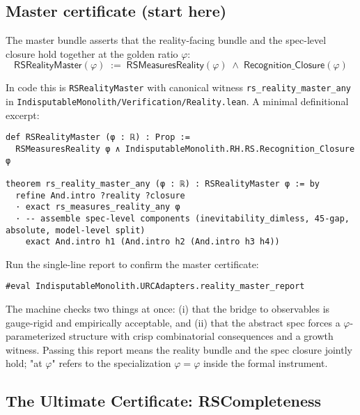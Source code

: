 \documentclass[11pt,a4paper,twoside]{article}
\numberwithin{equation}{section}
\newcommand{\phigr}{\varphi} %
\theoremstyle{customthm}
\theoremstyle{customdef}
\theoremstyle{customrem}
\begin{document}
\subsection{Master certificate (start here)}

\begin{importantbox}
The master bundle asserts that the reality-facing bundle and the spec-level closure hold together at the golden ratio $\varphi$:
\begin{equation}
\boxed{\mathsf{RSRealityMaster}(\varphi) \;:=\; \mathsf{RSMeasuresReality}(\varphi)\;\land\;\mathsf{Recognition\_Closure}(\varphi)}
\label{eq:master-cert}
\end{equation}
\end{importantbox}

\noindent
In code this is \texttt{RSRealityMaster} with canonical witness \texttt{rs\_reality\_master\_any} in \texttt{IndisputableMonolith/Verification/Reality.lean}. A minimal definitional excerpt:

\begin{lstlisting}
def RSRealityMaster (φ : ℝ) : Prop :=
  RSMeasuresReality φ ∧ IndisputableMonolith.RH.RS.Recognition_Closure φ

theorem rs_reality_master_any (φ : ℝ) : RSRealityMaster φ := by
  refine And.intro ?reality ?closure
  · exact rs_measures_reality_any φ
  · -- assemble spec-level components (inevitability_dimless, 45-gap, absolute, model-level split)
    exact And.intro h1 (And.intro h2 (And.intro h3 h4))
\end{lstlisting}

Run the single-line report to confirm the master certificate:

\begin{lstlisting}
#eval IndisputableMonolith.URCAdapters.reality_master_report
\end{lstlisting}

\begin{resultbox}[Meaning]
The machine checks two things at once: (i) that the bridge to observables is gauge-rigid and empirically acceptable, and (ii) that the abstract spec forces a $\varphi$-parameterized structure with crisp combinatorial consequences and a growth witness. Passing this report means the reality bundle and the spec closure jointly hold; "at $\varphi$" refers to the specialization $\varphi=\phigr$ inside the formal instrument.
\end{resultbox}

\subsection{The Ultimate Certificate: RSCompleteness}
\end{document}
